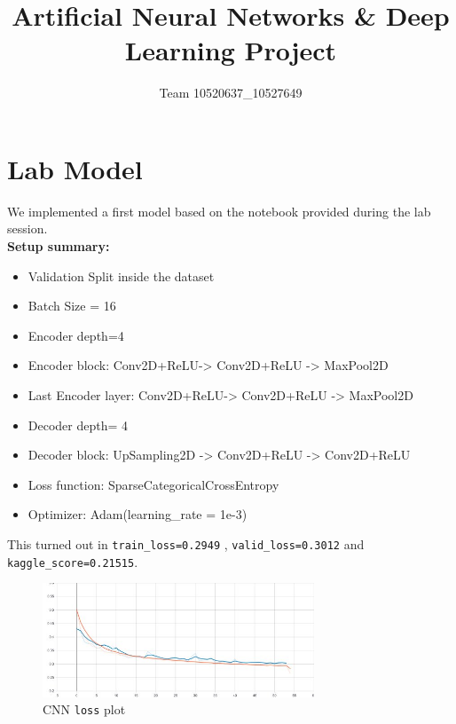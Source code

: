 \documentclass{article}
\title{Artificial Neural Networks \& Deep Learning
Project}
\author{Team 10520637\_10527649}
\begin{document}
	\maketitle

	\section{Lab Model}
		We implemented a first model based on the notebook provided during the lab session. \\
		\textbf{Setup summary:}
		
		\begin{itemize}
			
			\item Validation Split inside the dataset
			
			\item Batch Size = 16
			
			\item Encoder depth=4
			
			\item Encoder block: Conv2D+ReLU-> Conv2D+ReLU -> MaxPool2D
			
			\item Last Encoder layer: Conv2D+ReLU-> Conv2D+ReLU -> MaxPool2D
			
			\item Decoder depth= 4
			
			\item Decoder block: UpSampling2D -> Conv2D+ReLU -> Conv2D+ReLU
			
			\item Loss function: SparseCategoricalCrossEntropy
			
			\item Optimizer: Adam(learning\_rate = 1e-3)
		\end{itemize}				 
 

    	This turned out in \texttt{train\_loss=0.2949} , \texttt{valid\_loss=0.3012} and \texttt{kaggle\_score=0.21515}. 
    	
    	\begin{figure}[H]
			\centering
			\includegraphics[height=3.4cm, keepaspectratio]{First_Model_CNN_Dec04_19-24-31_epoch_loss.jpg}
			\caption{CNN \texttt{loss} plot}
		\end{figure}
	
\end{document}
